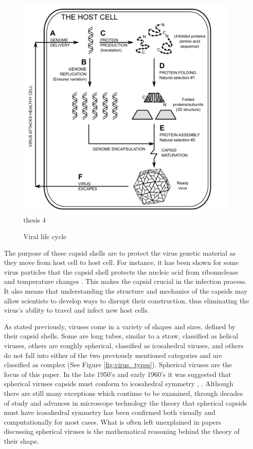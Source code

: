 \documentclass[12pt,letter]{article}
\begin{document}
\begin{figure}[h]
	\caption{Viral life cycle}
	\centering
	\includegraphics[width = .6\textwidth]{life_cycle.pdf}
	\label{fig:life_cycle}
	thesis 4
\end{figure}
	
The purpose of these capsid shells are to protect the virus genetic material as they move from host cell to host cell. For instance, it has been shown for some virus particles that the capsid shell protects the nucleic acid from ribonuclease and temperature changes \cite[p 5]{Caspar:1962}. This makes the capsid crucial in the infection process. It also means that understanding the structure and mechanics of the capsids may allow scientists to develop ways to disrupt their construction, thus eliminating the virus's ability to travel and infect new host cells. 

As stated previously, viruses come in a variety of shapes and sizes, defined by their capsid shells. Some are long tubes, similar to a straw, classified as helical viruses, others are roughly spherical, classified as icosahedral viruses, and others do not fall into either of the two previously mentioned categories and are classified as complex (See Figure \ref{fig:virus_types}). Spherical viruses are the focus of this paper. In the late 1950's and early 1960's it was suggested that spherical viruses capsids must conform to icosahedral symmetry \cite{Crick:1956}, \cite{Caspar:1962}. Although there are still many exceptions which continue to be examined, through decades of study and advances in microscope technology the theory that spherical capsids must have icosahedral symmetry has been confirmed both visually and computationally for most cases. What is often left unexplained in papers discussing spherical viruses is the mathematical reasoning behind the theory of their shape.
\end{document}
